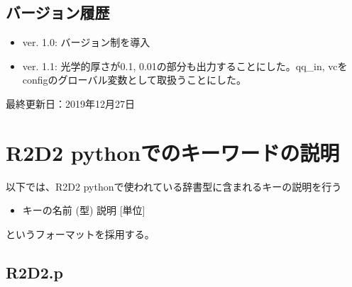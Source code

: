 \documentclass[letterpaper,10pt,dvipdfmx,report]{sphinxmanual}
\begin{document}
\section{バージョン履歴}
\label{\detokenize{io:id6}}\begin{itemize}
\item {} 
ver. 1.0: バージョン制を導入

\item {} 
ver. 1.1: 光学的厚さが0.1, 0.01の部分も出力することにした。qq\_in, vcをconfigのグローバル変数として取扱うことにした。

\end{itemize}

最終更新日：2019年12月27日


\chapter{R2D2 pythonでのキーワードの説明}
\label{\detokenize{notation:r2d2-python}}\label{\detokenize{notation::doc}}
以下では、R2D2 pythonで使われている辞書型に含まれるキーの説明を行う
\begin{itemize}
\item {} 
キーの名前 (型) \sphinxhyphen{}\sphinxhyphen{} 説明 {[}単位{]}

\end{itemize}

というフォーマットを採用する。


\section{R2D2.p}
\label{\detokenize{notation:r2d2-p}}
\end{document}
